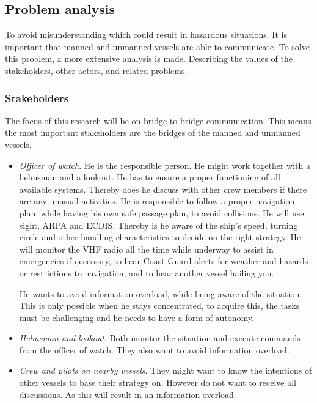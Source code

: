 \subsection{Problem analysis}
To avoid misunderstanding which could result in hazardous situations. It is important that manned and unmanned vessels are able to communicate. To solve this problem, a more extensive analysis is made. 
Describing the values of the stakeholders, other actors, and related problems.

\subsubsection{Stakeholders}
The focus of this research will be on bridge-to-bridge communication. This means the most important stakeholders are the bridges of the manned and unmanned vessels.
\begin{itemize}
	\item \emph{Officer of watch}. He is the responsible person. He might work together with a helmsman and a lookout. He has to ensure a proper functioning of all available systems. Thereby does he discuss with other crew members if there are any unusual activities. He is responsible to follow a proper navigation plan, while having his own safe passage plan, to avoid collisions. He will use sight, \ac{ARPA} and \ac{ECDIS}. Thereby is he aware of the ship's speed, turning circle and other handling characteristics to decide on the right strategy. He will monitor the \ac{VHF} radio all the time while underway to assist in emergencies if necessary, to hear Coast Guard alerts for weather and hazards or restrictions to navigation, and to hear another vessel hailing you.
	
	He wants to avoid information overload, while being aware of the situation. This is only possible when he stays concentrated, to acquire this, the tasks must be challenging and he needs to have a form of autonomy.

	\item \emph{Helmsman and lookout}. Both monitor the situation and execute commands from the officer of watch. They also want to avoid information overload.
	
	\item \emph{Crew and pilots on nearby vessels}. They might want to know the intentions of other vessels to base their strategy on. However do not want to receive all discussions. As this will result in an information overload.
\end{itemize}

